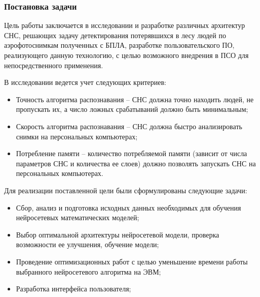 \subsubsection{Постановка задачи}

Цель работы заключается в исследовании и разработке различных архитектур СНС, решающих задачу детектирования потерявшихся в лесу людей по аэрофотоснимкам полученных с БПЛА, разработке пользовательского ПО, реализующего данную технологию, с целью возможного внедрения в ПСО для непосредственного применения.

В исследовании ведется учет следующих критериев:
\begin{itemize}
    \item Точность алгоритма распознавания -- СНС должна точно находить людей, не пропускать их, а число ложных срабатываний должно быть минимальным;
    \item Скорость алгоритма распознавания -- СНС должна быстро анализировать снимки на персональных компьютерах;
    \item Потребление памяти -- количество потребляемой памяти (зависит от числа параметров СНС и количества ее слоев) должно позволять запускать СНС на персональных компьютерах.
\end{itemize}

Для реализации поставленной цели были сформулированы следующие задачи:
\begin{itemize}
    \item Сбор, анализ и подготовка исходных данных необходимых для обучения нейросетевых математических моделей;
    \item Выбор оптимальной архитектуры нейросетевой модели, проверка возможности ее улучшения, обучение модели;
    \item Проведение оптимизационных работ с целью уменьшение времени работы выбранного нейросетевого алгоритма на ЭВМ;
    \item Разработка интерфейса пользователя;
\end{itemize}